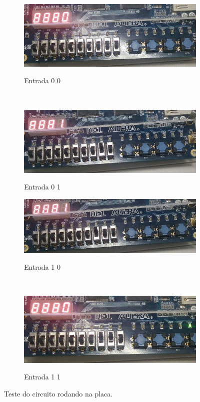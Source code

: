 		\begin{figure}[H]
			\centering

			\begin{subfigure}[b]{0.44\textwidth}
				\includegraphics[width=\textwidth]{img/etapa2/00}
				\label{fig:etapa2-00}
				\caption{Entrada 0 0}
			\end{subfigure}
			~
			\begin{subfigure}[b]{0.44\textwidth}
				\includegraphics[width=\textwidth]{img/etapa2/01}
				\label{fig:etapa2-01}
				\caption{Entrada 0 1}
			\end{subfigure}

			\begin{subfigure}[b]{0.44\textwidth}
				\includegraphics[width=\textwidth]{img/etapa2/10}
				\label{fig:etapa2-10}
				\caption{Entrada 1 0}
			\end{subfigure}
			~
			\begin{subfigure}[b]{0.44\textwidth}
				\includegraphics[width=\textwidth]{img/etapa2/11}
				\label{fig:etapa2-11}
				\caption{Entrada 1 1}
			\end{subfigure}

			\caption{Teste do circuito rodando na placa.}\label{fig:etapa2Teste}
		\end{figure}

